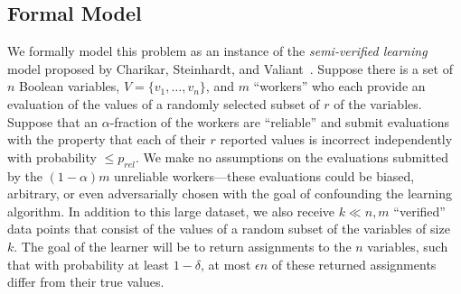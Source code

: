 \documentclass[anon,12pt]{colt2018}
\newcommand{\eps}{\epsilon}
\begin{document}
\begin{comment}
The above setting, where one has a large dataset reflecting a number of demographics, and wishes to leverage the large dataset in conjunction with a very small set of ``verified'' datapoints from one demographic of interest, seems widely applicable beyond the market research domain.  Indeed, there are many biological or health-related datasets where the ``demographic of interest'' might be a trait that is expensive to evaluate.  For example, perhaps one has a large database of medical records, and wishes to investigate the propensity of certain medical conditions for the subset of people with a specific genetic mutation.  The large dataset of medical records will likely not contain information about whether individuals have the mutation in question.  Nevertheless, our results imply that accurate inferences about this subset of people can likely be made as long as 1) the fraction of people with the mutation in the large dataset is not minuscule, and 2) one can obtain a small (i.e. constant) amount of data from individuals with the genetic mutation in question, for example studying a constant number of individuals who are known to have the mutation.
\end{comment}

\subsection{Formal Model}

We formally model this problem as an instance of the \emph{semi-verified learning} model proposed by Charikar, Steinhardt, and Valiant~\cite{CSV17}.   Suppose there is a set of $n$ Boolean variables, $V = \{v_1,\ldots,v_n\}$, and $m$ ``workers'' who each provide an evaluation of the values of a randomly selected subset of $r$ of the variables.  Suppose that an $\alpha$-fraction of the workers are ``reliable'' and submit evaluations with the property that each of their $r$ reported values is incorrect independently with probability $\le p_{rel}$.  We make no assumptions on the evaluations submitted by the $(1-\alpha)m$ unreliable workers---these evaluations could be biased, arbitrary, or even adversarially chosen with the goal of confounding the learning algorithm.   In addition to this large dataset, we also receive $k \ll n,m$ ``verified'' data points that consist of the values of a random subset of the variables of size $k.$   The goal of the learner will be to return assignments to the $n$ variables, such that with probability at least $1-\delta$, at most $\eps n$ of these returned assignments differ from their true values.
\end{document}
